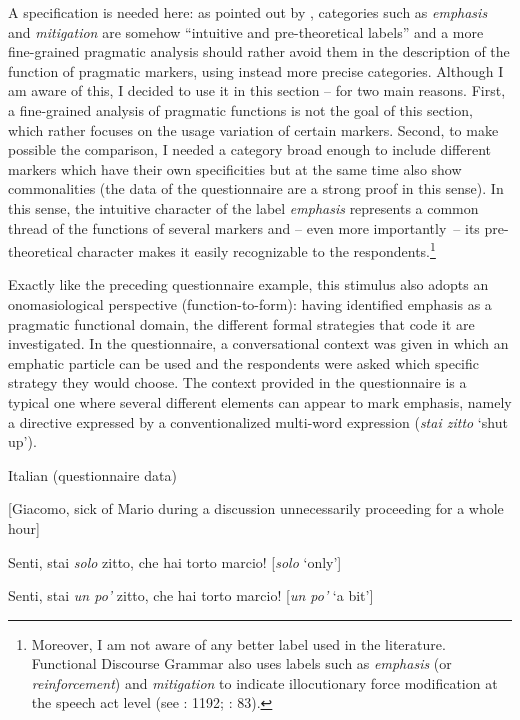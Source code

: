 A specification is needed here: as pointed out by \citet[1026]{Schwenter2003}, categories such as \textit{emphasis} and \textit{mitigation} are somehow “intuitive and pre-theoreti\-cal labels” and a more fine-grained pragmatic analysis should rather avoid them in the description of the function of pragmatic markers, using instead more precise categories. Although I am aware of this, I decided to use it in this section – for two main reasons. First, a fine-grained analysis of pragmatic functions is not the goal of this section, which rather focuses on the usage variation of certain markers. Second, to make possible the comparison, I needed a category broad enough to include different markers which have their own specificities but at the same time also show commonalities (the data of the questionnaire are a strong proof in this sense). In this sense, the intuitive character of the label \textit{emphasis} represents a common thread of the functions of several markers and – even more importantly~– its pre-theoretical character makes it easily recognizable to the respondents.\footnote{Moreover, I am not aware of any better label used in the literature. Functional Discourse Grammar also uses labels such as \textit{emphasis} (or \textit{reinforcement}) and \textit{mitigation} to indicate illocutionary force modification at the speech act level (see \citealt{Hengeveld2004}: 1192; \citealt{HengeveldMackenzie2008}: 83).}

Exactly like the preceding questionnaire example, this stimulus also adopts an onomasiological perspective (function-to-form): having identified emphasis as a pragmatic functional domain, the different formal strategies that code it are investigated. In the questionnaire, a conversational context was given in which an emphatic particle can be used and the respondents were asked which specific strategy they would choose. The context provided in the questionnaire is a typical one where several different elements can appear to mark emphasis, namely a directive expressed by a conventionalized multi-word expression (\textit{stai zitto} ‘shut up’).

\ea%
    \label{ex:key:106-2}

          Italian (questionnaire data)

[Giacomo, sick of Mario during a discussion unnecessarily proceeding for a whole hour]

Senti, stai \textit{solo} zitto, che hai torto marcio! [\textit{solo} ‘only’]

  Senti, stai \textit{un po’} zitto, che hai torto marcio! [\textit{un po’} ‘a bit’]

